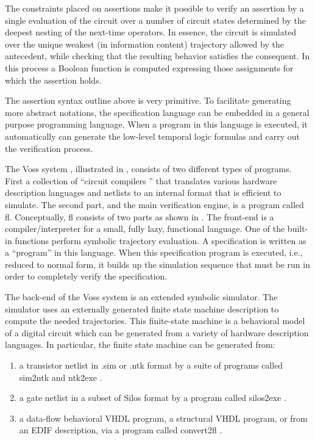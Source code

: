 
The constraints placed on assertions make it possible to verify an
assertion by a single evaluation of the circuit over a number of
circuit states determined by the deepest nesting of the next-time
operators. In essence, the circuit is simulated over the unique
weakest%
%
{} (in information content) trajectory allowed by the antecedent,
while checking that the resulting behavior satisfies the consequent.
In this process a Boolean function is computed expressing those
assignments for which the assertion holds.

The assertion syntax outline above is very primitive. To facilitate
generating more abstract notations, the specification language can
be embedded in a general purpose programming language. When a
program in this language is executed, it automatically can generate
the low-level temporal logic formulas and carry out the verification
process.

The Voss system%
%
{}, illustrated in , consists of two different
types of programs.
First a collection of ``circuit compilers%
%
{}'' that translates
various hardware description languages%
%
{} and netlists to
an internal format that is efficient to simulate.
The second part, and the main verification engine, is a program called fl.
Conceptually, fl%
%
{} consists of two parts as shown in .
The front-end is a compiler/interpreter
for a small, fully lazy, functional language.
One of the built-in functions perform symbolic trajectory evaluation.
A specification%
%
{} is written as a ``program'' in this language.
When this specification program is executed, i.e., reduced to normal
form, it builds up the simulation sequence that must be run in order
to completely verify the specification.



The back-end of the Voss system is an extended symbolic simulator.
The simulator uses an externally generated finite state machine%
%
{}
description to compute the needed trajectories. This finite-state
machine is a behavioral model of a digital circuit which can be
generated from a variety of hardware description languages.
In particular, the finite state machine can be generated from:
\begin{enumerate}
\item
a transistor netlist%
%
{} in .sim or .ntk format by
a suite of programs called sim2ntk%
%
{} and ntk2exe%
%
{}.
\item
a gate netlist%
%
{} in a subset of Silos%
%
{} format
by a program called silos2exe%
%
{}.
\item
a data-flow behavioral VHDL%
%
{}%
%
{} program, a structural VHDL%
%
{} program, or
from an EDIF%
%
{} description, via a program called convert2fl%
%
{}.
\end{enumerate}

